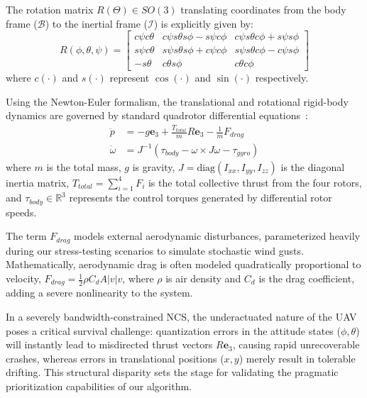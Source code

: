 The rotation matrix $R(\Theta) \in SO(3)$ translating coordinates from the body frame ($\mathcal{B}$) to the inertial frame ($\mathcal{I}$) is explicitly given by:
\begin{equation}
    R(\phi, \theta, \psi) = \begin{bmatrix} 
    c\psi c\theta & c\psi s\theta s\phi - s\psi c\phi & c\psi s\theta c\phi + s\psi s\phi \\
    s\psi c\theta & s\psi s\theta s\phi + c\psi c\phi & s\psi s\theta c\phi - c\psi s\phi \\
    -s\theta & c\theta s\phi & c\theta c\phi
    \end{bmatrix}
\end{equation}
where $c(\cdot)$ and $s(\cdot)$ represent $\cos(\cdot)$ and $\sin(\cdot)$ respectively.

Using the Newton-Euler formalism, the translational and rotational rigid-body dynamics are governed by standard quadrotor differential equations~\cite{MSTGCQ}:
\begin{align}
    \ddot{p} &= -g \mathbf{e}_3 + \frac{T_{total}}{m} R \mathbf{e}_3 - \frac{1}{m} F_{drag} \\
    \dot{\omega} &= J^{-1} (\tau_{body} - \omega \times J \omega - \tau_{gyro})
\end{align}
where $m$ is the total mass, $g$ is gravity, $J = \text{diag}(I_{xx}, I_{yy}, I_{zz})$ is the diagonal inertia matrix, $T_{total} = \sum_{i=1}^4 F_i$ is the total collective thrust from the four rotors, and $\tau_{body} \in \mathbb{R}^3$ represents the control torques generated by differential rotor speeds. 

The term $F_{drag}$ models external aerodynamic disturbances, parameterized heavily during our stress-testing scenarios to simulate stochastic wind gusts. Mathematically, aerodynamic drag is often modeled quadratically proportional to velocity, $F_{drag} = \frac{1}{2} \rho C_d A |v| v$, where $\rho$ is air density and $C_d$ is the drag coefficient, adding a severe nonlinearity to the system.

In a severely bandwidth-constrained NCS, the underactuated nature of the UAV poses a critical survival challenge: quantization errors in the attitude states ($\phi, \theta$) will instantly lead to misdirected thrust vectors $R \mathbf{e}_3$, causing rapid unrecoverable crashes, whereas errors in translational positions ($x, y$) merely result in tolerable drifting. This structural disparity sets the stage for validating the pragmatic prioritization capabilities of our algorithm.

